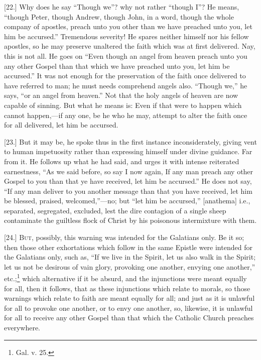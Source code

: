 [22.] Why does he say “Though we”? why not rather “though I”? He means, “though Peter, though Andrew, though John, in a word, though the whole company of apostles, preach unto you other than we have preached unto you, let him be accursed.” Tremendous severity! He spares neither himself nor his fellow apostles, so he may preserve unaltered the faith which was at first delivered. Nay, this is not all. He goes on “Even though an angel from heaven preach unto you any other Gospel than that which we have preached unto you, let him be accursed.” It was not enough for the preservation of the faith once delivered to have referred to man; he must needs comprehend angels also. “Though we,” he says, “or an angel from heaven.” Not that the holy angels of heaven are now capable of sinning. But what he means is: Even if that were to happen which cannot happen,—if any one, be he who he may, attempt to alter the faith once for all delivered, let him be accursed.

[23.] But it may be, he spoke thus in the first instance inconsiderately, giving vent to human impetuosity rather than expressing himself under divine guidance. Far from it. He follows up what he had said, and urges it with intense reiterated earnestness, “As we said before, so say I now again, If any man preach any other Gospel to you than that ye have received, let him be accursed.” He does not say, “If any man deliver to you another message than that you have received, let him be blessed, praised, welcomed,”—no; but “let him be accursed,” [anathema] i.e., separated, segregated, excluded, lest the dire contagion of a single sheep contaminate the guiltless flock of Christ by his poisonous intermixture with them.


[24.] \textsc{But}, possibly, this warning was intended for the Galatians only. Be it so; then those other exhortations which follow in the same Epistle were intended for the Galatians only, such as, “If we live in the Spirit, let us also walk in the Spirit; let us not be desirous of vain glory, provoking one another, envying one another,” etc.;\footnote{Gal. v. 25.} which alternative if it be absurd, and the injunctions were meant equally for all, then it follows, that as these injunctions which relate to morals, so those warnings which relate to faith are meant equally for all; and just as it is unlawful for all to provoke one another, or to envy one another, so, likewise, it is unlawful for all to receive any other Gospel than that which the Catholic Church preaches everywhere.


